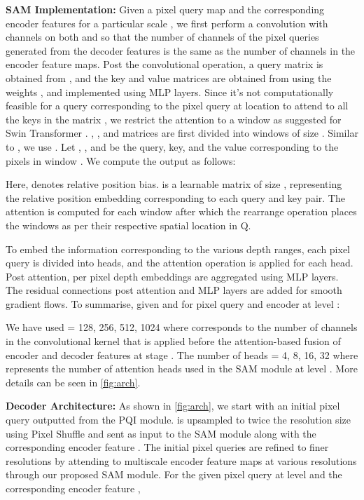\documentclass[10pt,twocolumn,letterpaper]{article}
\newcommand{\myfirstpara}[1]{\par \noindent \textbf{#1:}}
\newcommand{\mypara}[1]{\vspace{0.5em} \myfirstpara{#1}}
\begin{document}
\mypara{SAM Implementation}
Given a pixel query map  and the corresponding encoder features  for a particular scale , we first perform a  convolution  with  channels on both  and  so that the number of channels of the pixel queries generated from the decoder features is the same as the number of channels in the encoder feature maps. Post the convolutional operation, a query matrix  is obtained from  , and the key  and value  matrices are obtained from  using the weights ,  and  implemented using MLP layers.
Since it's not computationally feasible for a query  corresponding to the pixel query at location  to attend to all the keys in the matrix , we restrict the attention to a window as suggested for Swin Transformer \cite{swin}. , , and  matrices are first divided into windows of size . Similar to \cite{swin}, we use . Let , , and  be the query, key, and the value corresponding to the pixels in window . We compute the output as follows:

Here,  denotes relative position bias.  is a learnable matrix of size , representing the relative position embedding corresponding to each query and key pair. The attention is computed for each window  after which the rearrange operation places the windows as per their respective spatial location in Q.

To embed the information corresponding to the various depth ranges, each pixel query is divided into  heads, and the attention operation is applied for each head. Post attention, per pixel depth embeddings are aggregated using MLP layers. The residual connections post attention and MLP layers are added for smooth gradient flows. To summarise, given  and  for pixel query and encoder at level :

We have used  = 128, 256, 512, 1024 where  corresponds to the number of channels in the convolutional kernel that is applied before the attention-based fusion of encoder and decoder features at stage . The number of heads  = 4, 8, 16, 32 where  represents the number of attention heads used in the SAM module at level . More details can be seen in \cref{fig:arch}.

\mypara{Decoder Architecture}
As shown in \cref{fig:arch}, we start with an initial pixel query  outputted from the PQI module.  is upsampled to twice the resolution size using Pixel Shuffle \cite{pixelshuffle} and sent as input to the SAM module along with the corresponding encoder feature . The initial pixel queries are refined to finer resolutions by attending to multiscale encoder feature maps at various resolutions through our proposed SAM module. For the given pixel query at level  and the corresponding encoder feature ,
\end{document}
